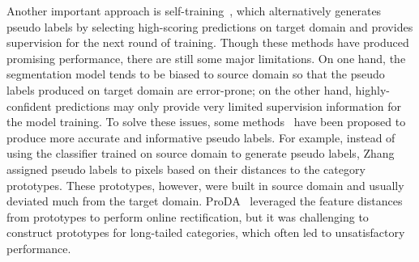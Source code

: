 \documentclass[10pt,twocolumn,letterpaper]{article}
\begin{document}
	Another important approach is self-training~\cite{zou2018unsupervised,zou2019confidence,zhang2017curriculum}, which alternatively generates pseudo labels by selecting high-scoring predictions on target domain and provides supervision for the next round of training. Though these methods have produced promising performance, there are still some major limitations. On one hand, the segmentation model tends to be biased to source domain so that the pseudo labels produced on target domain are error-prone; on the other hand, highly-confident predictions may only provide very limited supervision information for the model training. To solve these issues, some methods~\cite{zhang2019category,zhang2021prototypical} have been proposed to produce more accurate and informative pseudo labels. For example, instead of using the classifier trained on source domain to generate pseudo labels, Zhang \etal~\cite{zhang2019category} assigned pseudo labels to pixels based on their distances to the category prototypes. These prototypes, however, were built in source domain and usually deviated much from the target domain. ProDA~\cite{zhang2021prototypical} leveraged the feature distances from prototypes to perform online rectification, but it was challenging to construct prototypes for long-tailed categories, which often led to unsatisfactory performance.  
	
\end{document}
